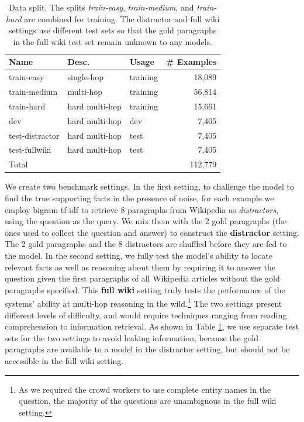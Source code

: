 \begin{table}
\small
    \centering
    \begin{tabular}{l l l r}
        \toprule
        Name & Desc. & Usage & \# Examples \\
        \midrule
        train-easy & single-hop & training & 18,089 \\
        train-medium & multi-hop & training & 56,814 \\
        train-hard & hard multi-hop & training & 15,661 \\
        dev & hard multi-hop & dev & 7,405 \\
        test-distractor & hard multi-hop & test & 7,405 \\
        test-fullwiki & hard multi-hop & test & 7,405 \\
        \multicolumn{3}{l}{Total} & 112,779 \\
        \bottomrule
    \end{tabular}
    \caption{Data split. The splits \textit{train-easy}, \textit{train-medium}, and \textit{train-hard} are combined for training. The distractor and full wiki settings use different test sets %
    so that the gold paragraphs in the full wiki test set remain unknown to any models.} \label{tab:split}
\end{table}

We create two benchmark settings.
In the first setting, to challenge the model to find the true supporting facts in the presence of noise, for each example we employ bigram tf-idf \cite{chen2017reading} to retrieve 8 paragraphs from Wikipedia as \textit{distractors}, using the question as the query.
We mix them with the 2 gold paragraphs (the ones used to collect the question and answer) to construct the \textbf{distractor} setting.
The 2 gold paragraphs and the 8 distractors are shuffled before they are fed to the model.
In the second setting, we fully test the model's ability to locate relevant facts as well as reasoning about them by requiring it to answer the question given the first paragraphs of all Wikipedia articles without the gold paragraphs specified.
This \textbf{full wiki} setting truly tests the performance of the systems' ability at multi-hop reasoning in the wild.\footnote{As we required the crowd workers to use complete entity names in the question, the majority of the questions are unambiguous in the full wiki setting.}
The two settings present different levels of difficulty, and would require techniques ranging from reading comprehension to information retrieval.
As shown in Table \ref{tab:split}, we use separate test sets for the two settings to avoid leaking information, because the gold paragraphs are available to a model in the distractor setting, but should not be accessible in the full wiki setting.

